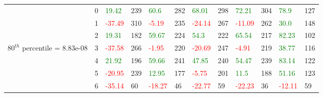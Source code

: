 \begin{table}[htb!]
\begin{adjustwidth}{-0.9in}{-0.9in}
\begin{tabular}{|p{5em}|p{2em}|p{3em}|p{3em}|p{3em}|p{3em}|p{3em}|p{3em}|p{3em}|p{3em}|p{3em}|p{3em}|}
            & 0 & \textcolor{green}{19.42} & 239 & \textcolor{green}{60.6} & 282 & \textcolor{green}{68.01} & 298 & \textcolor{green}{72.21} & 304 & \textcolor{green}{78.9} & 127\\\cline{3-12}
            & 1 & \textcolor{red}{-37.49} & 310 & \textcolor{red}{-5.19} & 235 & \textcolor{red}{-24.14} & 267 & \textcolor{red}{-11.09} & 262 & \textcolor{green}{30.0} & 148\\\cline{3-12}
            & 2 & \textcolor{green}{19.31} & 182 & \textcolor{green}{59.67} & 224 & \textcolor{green}{54.3} & 222 & \textcolor{green}{65.54} & 217 & \textcolor{green}{82.23} & 102\\\cline{3-12}
            $80^{th}$ percentile = 8.83e-08 & 3 & \textcolor{red}{-37.58} & 266 & \textcolor{red}{-1.95} & 220 & \textcolor{red}{-20.69} & 247 & \textcolor{red}{-4.91} & 219 & \textcolor{green}{38.77} & 116\\[-5.5ex]\cline{3-12}
            & 4 & \textcolor{green}{21.92} & 196 & \textcolor{green}{59.66} & 241 & \textcolor{green}{47.85} & 240 & \textcolor{green}{54.47} & 239 & \textcolor{green}{83.14} & 122\\\cline{3-12}
            & 5 & \textcolor{red}{-20.95} & 239 & \textcolor{green}{12.95} & 177 & \textcolor{red}{-5.75} & 201 & \textcolor{green}{11.5} & 188 & \textcolor{green}{51.16} & 123\\\cline{3-12}
            & 6 & \textcolor{red}{-35.14} & 60 & \textcolor{red}{-18.27} & 46 & \textcolor{red}{-22.77} & 59 & \textcolor{red}{-22.23} & 36 & \textcolor{red}{-12.11} & 59\\\hline\hline


\end{tabular}
\end{adjustwidth}
\end{table}
